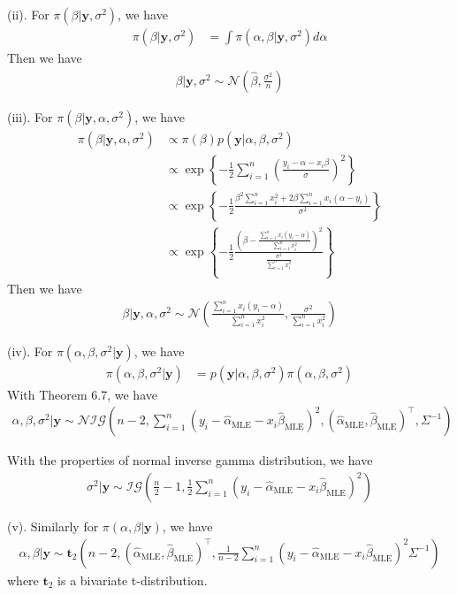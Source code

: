 (ii). For $\pi(\beta \vert \bm{y}, \sigma^2)$, we have
\begin{align*}
    \pi(\beta \vert \bm{y}, \sigma^2)
    &= \int \pi(\alpha, \beta \vert \bm{y}, \sigma^2) d\alpha
\end{align*}
Then we have 
\begin{align*}
\beta \vert \bm{y}, \sigma^2 \sim \mathcal{N}(\hat{\beta}, \frac{\sigma^2}{n})    
\end{align*}

(iii). For $\pi(\beta \vert \bm{y}, \alpha, \sigma^2)$, we have
\begin{align*}
    \pi(\beta \vert \bm{y}, \alpha, \sigma^2)
    &\propto \pi(\beta) p(\bm{y} \vert \alpha, \beta, \sigma^2)\\
    &\propto \exp \left\{-\frac{1}{2} \sum_{i=1}^{n}\left( \frac{y_i - \alpha - x_i \beta }{\sigma} \right)^2 \right\}\\
    &\propto \exp \left\{
        -\frac{1}{2} \frac{\beta^2 \sum_{i=1}^n x_i^2 + 2\beta\sum_{i=1}^n x_i(\alpha-y_i)}{\sigma^2}
        \right\}\\
    &\propto \exp \left\{
        -\frac{1}{2} \frac{( \beta - \frac{\sum_{i=1}^n x_i(y_i-\alpha)}{\sum_{i=1}^n x_i^2})^2}{\frac{\sigma^2}{\sum_{i=1}^n x_i^2}}
        \right\}
\end{align*}
Then we have 
\begin{align*}
\beta \vert \bm{y}, \alpha, \sigma^2 \sim \mathcal{N}(\frac{\sum_{i=1}^n x_i(y_i-\alpha)}{\sum_{i=1}^n x_i^2}, \frac{\sigma^2}{\sum_{i=1}^n x_i^2})    
\end{align*}

(iv). For $\pi(\alpha, \beta, \sigma^2 \vert \bm{y})$, we have
\begin{align*}
    \pi(\alpha, \beta, \sigma^2 \vert \bm{y})
    &= p(\bm{y} \vert \alpha, \beta, \sigma^2) \pi (\alpha, \beta, \sigma^2)
\end{align*}
With Theorem 6.7, we have
\begin{align*}
    \alpha, \beta, \sigma^2 \vert \bm{y} \sim \mathcal{NIG}(n-2, \sum_{i=1}^{n}\left( y_i - \hat{\alpha}_{\mathrm{MLE}} - x_i \hat{\beta}_{\mathrm{MLE}} \right)^2, (\hat{\alpha}_{\mathrm{MLE}}, \hat{\beta}_{\mathrm{MLE}})^{\top}, \Sigma^{-1})
\end{align*}

With the properties of normal inverse gamma distribution, we have 
\begin{align*}
  \sigma^2 \vert \bm{y} \sim \mathcal{IG}\left( \frac{n}{2}-1, \frac{1}{2}\sum_{i=1}^{n}\left( y_i - \hat{\alpha}_{\mathrm{MLE}} - x_i \hat{\beta}_{\mathrm{MLE}} \right)^2 \right)  
\end{align*}

(v). Similarly for $\pi(\alpha, \beta \vert \bm{y})$, we have
\begin{align*}
    \alpha, \beta \vert \bm{y} \sim \bm{t}_2 (n-2, (\hat{\alpha}_{\mathrm{MLE}}, \hat{\beta}_{\mathrm{MLE}})^{\top}, \frac{1}{n-2} \sum_{i=1}^{n}\left( y_i - \hat{\alpha}_{\mathrm{MLE}} - x_i \hat{\beta}_{\mathrm{MLE}} \right)^2 \Sigma^{-1})
\end{align*}
where $\bm{t}_2$ is a bivariate t-distribution. 